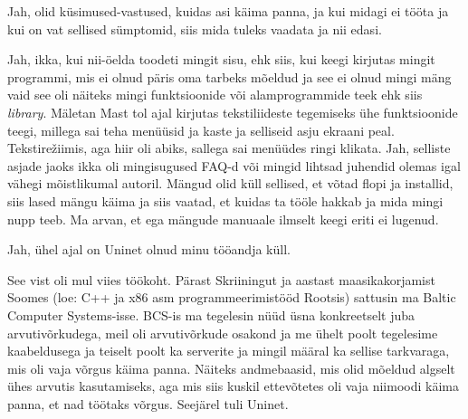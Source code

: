 
Jah,   olid küsimused-vastused, kuidas asi käima panna, ja kui midagi ei tööta 
ja kui on vat sellised sümptomid, siis mida tuleks vaadata ja nii edasi.


Jah, ikka, kui nii-öelda toodeti mingit sisu, ehk siis, kui keegi kirjutas mingit 
programmi, mis ei olnud  päris oma tarbeks mõeldud ja see ei olnud mingi mäng 
vaid see oli näiteks mingi funktsioonide või alamprogrammide teek ehk siis 
\emph{library}. Mäletan Mast tol ajal kirjutas 
tekstiliideste tegemiseks ühe funktsioonide teegi, millega sai teha menüüsid ja 
kaste ja selliseid asju ekraani peal. Tekstirežiimis, aga hiir oli  abiks, 
sallega sai menüüdes ringi klikata. Jah, selliste asjade jaoks ikka oli 
mingisugused FAQ-d või mingid lihtsad juhendid olemas igal vähegi mõistlikumal 
autoril. Mängud olid küll sellised, et võtad flopi ja installid, siis 
lased mängu käima ja siis vaatad, et kuidas ta tööle hakkab ja mida mingi nupp 
teeb. Ma arvan, et ega mängude manuaale ilmselt keegi eriti ei lugenud.


Jah, ühel ajal on Uninet  olnud minu tööandja küll.


See vist oli mul viies töökoht. Pärast Skriiningut ja aastast maasikakorjamist Soomes
(loe: C++ ja x86 asm programmeerimistööd Rootsis) sattusin ma Baltic 
Computer Systems-isse.
BCS-is ma tegelesin  nüüd üsna konkreetselt juba arvutivõrkudega, 
meil oli arvutivõrkude osakond ja me  ühelt poolt tegelesime 
kaabeldusega ja teiselt poolt  ka serverite ja mingil määral ka sellise 
tarkvaraga, mis  oli vaja võrgus käima panna. Näiteks andmebaasid, mis olid 
mõeldud algselt ühes arvutis kasutamiseks, aga mis siis kuskil ettevõtetes oli 
vaja niimoodi käima panna, et nad töötaks võrgus. Seejärel tuli Uninet.



